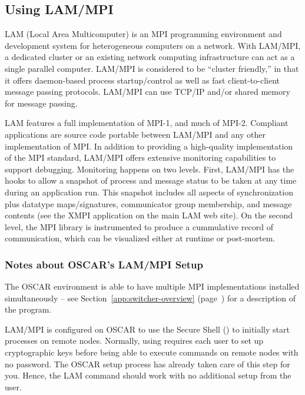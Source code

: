 %
%
%

\subsection{Using LAM/MPI}
\label{app:lam-mpi-overview}

LAM (Local Area Multicomputer) is an MPI programming environment and
development system for heterogeneous computers on a network. With
LAM/MPI, a dedicated cluster or an existing network computing
infrastructure can act as a single parallel computer.  LAM/MPI is
considered to be ``cluster friendly,'' in that it offers daemon-based
process startup/control as well as fast client-to-client message
passing protocols.  LAM/MPI can use TCP/IP and/or shared memory for
message passing.

LAM features a full implementation of MPI-1, and much of MPI-2.
Compliant applications are source code portable between LAM/MPI and
any other implementation of MPI.  In addition to providing a
high-quality implementation of the MPI standard, LAM/MPI offers
extensive monitoring capabilities to support debugging.  Monitoring
happens on two levels.  First, LAM/MPI has the hooks to allow a
snapshot of process and message status to be taken at any time during
an application run.  This snapshot includes all aspects of
synchronization plus datatype maps/signatures, communicator group
membership, and message contents (see the XMPI application on the main
LAM web site).  On the second level, the MPI library is instrumented
to produce a cummulative record of communication, which can be
visualized either at runtime or post-mortem.

\subsubsection{Notes about OSCAR's LAM/MPI Setup}

The OSCAR environment is able to have multiple MPI implementations
installed simultaneously -- see Section~\ref{app:switcher-overview}
(page~\pageref{app:switcher-overview}) for a description of the
 program.  

LAM/MPI is configured on OSCAR to use the Secure Shell () to
initially start processes on remote nodes.  Normally, using 
requires each user to set up cryptographic keys before being able to
execute commands on remote nodes with no password.  The OSCAR setup
process has already taken care of this step for you.  Hence, the LAM
command  should work with no additional setup from the
user.

